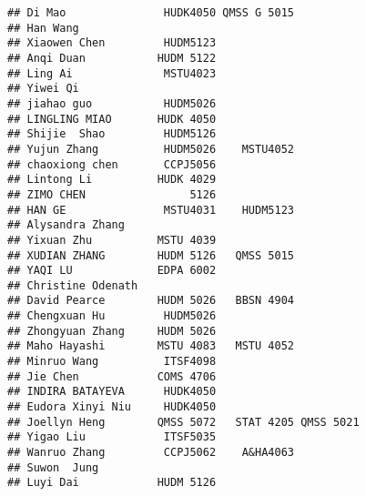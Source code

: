 \documentclass[]{article}
\newenvironment{Shaded}{\begin{snugshade}}{\end{snugshade}}
\newcommand{\CommentTok}[1]{\textcolor[rgb]{0.56,0.35,0.01}{\textit{#1}}}
\newcommand{\DataTypeTok}[1]{\textcolor[rgb]{0.13,0.29,0.53}{#1}}
\newcommand{\KeywordTok}[1]{\textcolor[rgb]{0.13,0.29,0.53}{\textbf{#1}}}
\newcommand{\NormalTok}[1]{#1}
\newcommand{\OperatorTok}[1]{\textcolor[rgb]{0.81,0.36,0.00}{\textbf{#1}}}
\newcommand{\StringTok}[1]{\textcolor[rgb]{0.31,0.60,0.02}{#1}}
\begin{document}
\begin{verbatim}
## Di Mao               HUDK4050 QMSS G 5015          
## Han Wang                                           
## Xiaowen Chen         HUDM5123                      
## Anqi Duan           HUDM 5122                      
## Ling Ai              MSTU4023                      
## Yiwei Qi                                           
## jiahao guo           HUDM5026                      
## LINGLING MIAO       HUDK 4050                      
## Shijie  Shao         HUDM5126                      
## Yujun Zhang          HUDM5026    MSTU4052          
## chaoxiong chen       CCPJ5056                      
## Lintong Li          HUDK 4029                      
## ZIMO CHEN                5126                      
## HAN GE               MSTU4031    HUDM5123          
## Alysandra Zhang                                    
## Yixuan Zhu          MSTU 4039                      
## XUDIAN ZHANG        HUDM 5126   QMSS 5015          
## YAQI LU             EDPA 6002                      
## Christine Odenath                                  
## David Pearce        HUDM 5026   BBSN 4904          
## Chengxuan Hu         HUDM5026                      
## Zhongyuan Zhang     HUDM 5026                      
## Maho Hayashi        MSTU 4083   MSTU 4052          
## Minruo Wang          ITSF4098                      
## Jie Chen            COMS 4706                      
## INDIRA BATAYEVA      HUDK4050                      
## Eudora Xinyi Niu     HUDK4050                      
## Joellyn Heng        QMSS 5072   STAT 4205 QMSS 5021
## Yigao Liu            ITSF5035                      
## Wanruo Zhang         CCPJ5062    A&HA4063          
## Suwon  Jung                                        
## Luyi Dai            HUDM 5126
\end{verbatim}

\begin{Shaded}
\end{Shaded}
\end{document}
